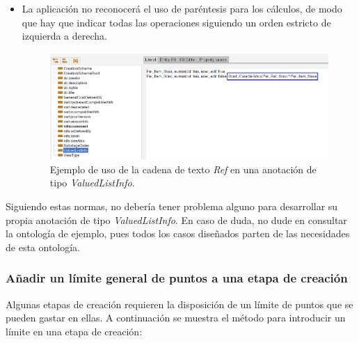 \begin{itemize}
    \item La aplicación no reconocerá el uso de paréntesis para los cálculos, de modo que hay que indicar todas las operaciones siguiendo 
    un orden estricto de izquierda a derecha.

    \begin{figure}[H]
        \centering
        \includegraphics[scale=0.6]{Figures/Protege/Ref_example.png}
        \caption{Ejemplo de uso de la cadena de texto \textit{Ref} en una anotación de tipo \textit{ValuedListInfo}.}
        \label{Ref_example}
    \end{figure}
\end{itemize}

Siguiendo estas normas, no debería tener problema alguno para desarrollar su propia anotación de tipo \textit{ValuedListInfo}.
En caso de duda, no dude en consultar la ontología de ejemplo, pues todos los casos diseñados parten de las necesidades de 
esta ontología.

\subsubsection{Añadir un límite general de puntos a una etapa de creación}\label{GeneralLimit}
Algunas etapas de creación requieren la disposición de un límite de puntos que se pueden gastar en ellas. A continuación
se muestra el método para introducir un límite en una etapa de creación:

